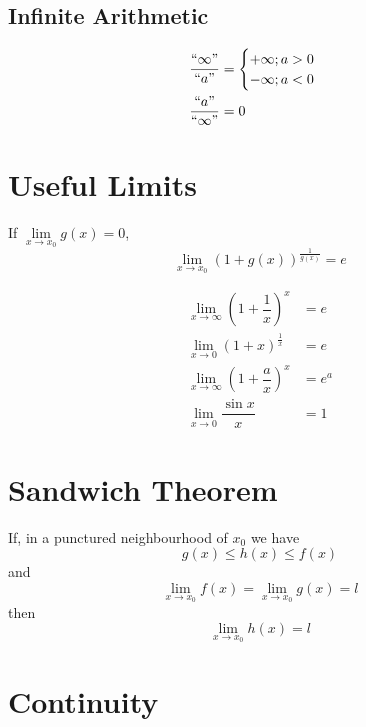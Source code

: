\documentclass[fleqn]{article}
\begin{document}
\subsection{Infinite Arithmetic}

\begin{align*}
	\dfrac{``\infty"}{``a"} &= 
	\begin{cases}
		+ \infty ; a > 0 \\
		- \infty ; a < 0 \\
	\end{cases} \\
	\dfrac{``a"}{``\infty"} &= 0
\end{align*}

\section{Useful Limits}

If $\lim\limits_{x \rightarrow x_0} g(x) = 0$, 
\begin{equation*}
	\lim\limits_{x \rightarrow x_0} (1 + g(x))^{\frac{1}{g(x)}} = e
\end{equation*}

\begin{align*}	
	\lim\limits_{x \rightarrow \infty} \left(1 + \dfrac{1}{x}\right)^x &= e \\
	\lim\limits_{x \rightarrow 0} \left(1 + x\right)^{\frac{1}{x}} &= e \\
	\lim\limits_{x \rightarrow \infty} \left(1 + \dfrac{a}{x}\right)^x &= e^a \\
	\lim\limits_{x \rightarrow 0} \dfrac{\sin x}{x} &= 1
\end{align*}

\section{Sandwich Theorem}

If, in a punctured neighbourhood of $x_0$ we have 
\begin{equation*}
	g(x) \leq h(x) \leq f(x)
\end{equation*} and \begin{equation*}
\lim\limits_{x \rightarrow x_0} f(x) = \lim\limits_{x \rightarrow x_0} g(x) = l
\end{equation*}
then
\begin{equation*}
\lim\limits_{x \rightarrow x_0} h(x) = l
\end{equation*} 

\section{Continuity}
\end{document}
